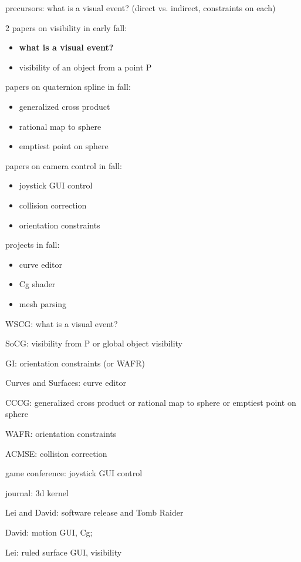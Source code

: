 \documentclass[12pt]{article}
\begin{document}
\clearpage

precursors:
what is a visual event? (direct vs. indirect, constraints on each)

2 papers on visibility in early fall:
\begin{itemize}
\item {\bf what is a visual event?}
\item visibility of an object from a point P
\end{itemize}

 papers on quaternion spline in fall:
\begin{itemize}
\item generalized cross product
\item rational map to sphere
\item emptiest point on sphere
\end{itemize}

 papers on camera control in fall:
\begin{itemize}
\item joystick GUI control
\item collision correction
\item orientation constraints
\end{itemize}

 projects in fall:
\begin{itemize}
\item curve editor
\item Cg shader
\item mesh parsing
\end{itemize}

WSCG: what is a visual event?

SoCG: visibility from P or global object visibility

GI:   orientation constraints (or WAFR)

Curves and Surfaces: curve editor

CCCG: generalized cross product or rational map to sphere or emptiest point on sphere

WAFR: orientation constraints

ACMSE: collision correction

game conference: joystick GUI control

journal: 3d kernel

Lei and David: software release and Tomb Raider

David: motion GUI, Cg; 

Lei: ruled surface GUI, visibility
\end{document}
